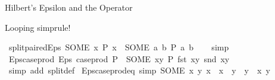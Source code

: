 \begin{isabellebody}
{\isafolddocument}%
%
\isadelimdocument
%
\endisadelimdocument
%
\begin{isamarkuptext}%
Hilbert's Epsilon and the  Operator%
\end{isamarkuptext}\isamarkuptrue%
%
\begin{isamarkuptext}%
Looping simprule!%
\end{isamarkuptext}\isamarkuptrue%
\isamarkupfalse%
\ split{\isacharunderscore}{\kern0pt}paired{\isacharunderscore}{\kern0pt}Eps{\isacharcolon}{\kern0pt}\ {\isachardoublequoteopen}{\isacharparenleft}{\kern0pt}SOME\ x{\isachardot}{\kern0pt}\ P\ x{\isacharparenright}{\kern0pt}\ {\isacharequal}{\kern0pt}\ {\isacharparenleft}{\kern0pt}SOME\ {\isacharparenleft}{\kern0pt}a{\isacharcomma}{\kern0pt}\ b{\isacharparenright}{\kern0pt}{\isachardot}{\kern0pt}\ P\ {\isacharparenleft}{\kern0pt}a{\isacharcomma}{\kern0pt}\ b{\isacharparenright}{\kern0pt}{\isacharparenright}{\kern0pt}{\isachardoublequoteclose}\isanewline
%
\isadelimproof
\ \ %
\endisadelimproof
%
\isatagproof
{}\isamarkupfalse%
\ simp%
\endisatagproof
{\isafoldproof}%
%
\isadelimproof
\isanewline
%
\endisadelimproof
\isanewline
{}\isamarkupfalse%
\ Eps{\isacharunderscore}{\kern0pt}case{\isacharunderscore}{\kern0pt}prod{\isacharcolon}{\kern0pt}\ {\isachardoublequoteopen}Eps\ {\isacharparenleft}{\kern0pt}case{\isacharunderscore}{\kern0pt}prod\ P{\isacharparenright}{\kern0pt}\ {\isacharequal}{\kern0pt}\ {\isacharparenleft}{\kern0pt}SOME\ xy{\isachardot}{\kern0pt}\ P\ {\isacharparenleft}{\kern0pt}fst\ xy{\isacharparenright}{\kern0pt}\ {\isacharparenleft}{\kern0pt}snd\ xy{\isacharparenright}{\kern0pt}{\isacharparenright}{\kern0pt}{\isachardoublequoteclose}\isanewline
%
\isadelimproof
\ \ %
\endisadelimproof
%
\isatagproof
{}\isamarkupfalse%
\ {\isacharparenleft}{\kern0pt}simp\ add{\isacharcolon}{\kern0pt}\ split{\isacharunderscore}{\kern0pt}def{\isacharparenright}{\kern0pt}%
\endisatagproof
{\isafoldproof}%
%
\isadelimproof
\isanewline
%
\endisadelimproof
\isanewline
{}\isamarkupfalse%
\ Eps{\isacharunderscore}{\kern0pt}case{\isacharunderscore}{\kern0pt}prod{\isacharunderscore}{\kern0pt}eq\ {\isacharbrackleft}{\kern0pt}simp{\isacharbrackright}{\kern0pt}{\isacharcolon}{\kern0pt}\ {\isachardoublequoteopen}{\isacharparenleft}{\kern0pt}SOME\ {\isacharparenleft}{\kern0pt}x{\isacharprime}{\kern0pt}{\isacharcomma}{\kern0pt}\ y{\isacharprime}{\kern0pt}{\isacharparenright}{\kern0pt}{\isachardot}{\kern0pt}\ x\ {\isacharequal}{\kern0pt}\ x{\isacharprime}{\kern0pt}\ {\isasymand}\ y\ {\isacharequal}{\kern0pt}\ y{\isacharprime}{\kern0pt}{\isacharparenright}{\kern0pt}\ {\isacharequal}{\kern0pt}\ {\isacharparenleft}{\kern0pt}x{\isacharcomma}{\kern0pt}\ y{\isacharparenright}{\kern0pt}{\isachardoublequoteclose}\isanewline

\end{isabellebody}
